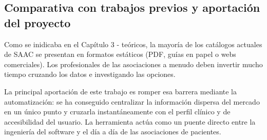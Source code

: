 \subsection{Comparativa con trabajos previos y aportación del proyecto}
Como se inidicaba en el Capítulo 3 - teóricos, la mayoría de los catálogos actuales de SAAC se presentan en formatos estáticos (PDF, guías en papel o webs comerciales). Los profesionales de las asociaciones a menudo deben invertir mucho tiempo cruzando los datos e investigando las opciones.

La principal aportación de este trabajo es romper esa barrera mediante la automatización: se ha conseguido centralizar la información dispersa del mercado en un único punto y cruzarla instantáneamente con el perfil clínico y de accesibilidad del usuario. La herramienta actúa como un puente directo entre la ingeniería del software y el día a día de las asociaciones de pacientes.